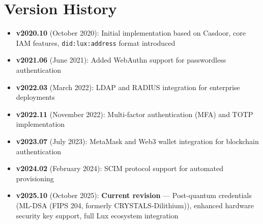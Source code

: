 \section*{Version History}


\begin{itemize}[leftmargin=*]
  \item \textbf{v2020.10} (October 2020): Initial implementation based on Casdoor, core IAM features, \texttt{did:lux:address} format introduced
  \item \textbf{v2021.06} (June 2021): Added WebAuthn support for passwordless authentication
  \item \textbf{v2022.03} (March 2022): LDAP and RADIUS integration for enterprise deployments
  \item \textbf{v2022.11} (November 2022): Multi-factor authentication (MFA) and TOTP implementation
  \item \textbf{v2023.07} (July 2023): MetaMask and Web3 wallet integration for blockchain authentication
  \item \textbf{v2024.02} (February 2024): SCIM protocol support for automated provisioning
  \item \textbf{v2025.10} (October 2025): \textbf{Current revision} — Post-quantum credentials (ML-DSA (FIPS 204, formerly CRYSTALS-Dilithium)), enhanced hardware security key support, full Lux ecosystem integration
\end{itemize}

\tableofcontents
\newpage

